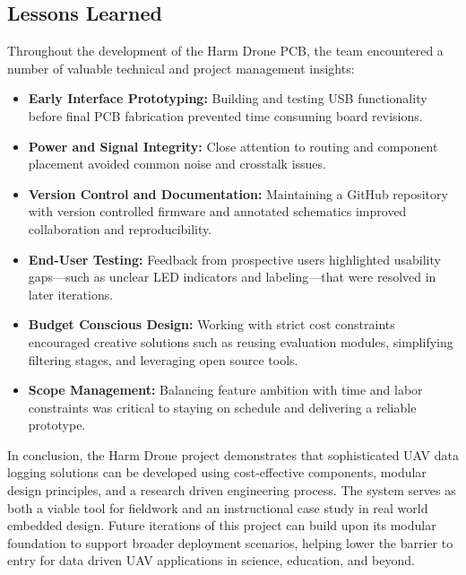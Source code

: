 \documentclass[12pt]{article}
\begin{document}
\subsection{Lessons Learned}

Throughout the development of the Harm Drone PCB, the team encountered a number of valuable technical and project management insights:

\begin{itemize}
\item \textbf{Early Interface Prototyping:} Building and testing USB functionality before final PCB fabrication prevented time consuming board revisions.
\item \textbf{Power and Signal Integrity:} Close attention to routing and component placement avoided common noise and crosstalk issues.
\item \textbf{Version Control and Documentation:} Maintaining a GitHub repository with version controlled firmware and annotated schematics improved collaboration and reproducibility.
\item \textbf{End-User Testing:} Feedback from prospective users highlighted usability gaps—such as unclear LED indicators and labeling—that were resolved in later iterations.
\item \textbf{Budget Conscious Design:} Working with strict cost constraints encouraged creative solutions such as reusing evaluation modules, simplifying filtering stages, and leveraging open source tools.
\item \textbf{Scope Management:} Balancing feature ambition with time and labor constraints was critical to staying on schedule and delivering a reliable prototype.
\end{itemize}

\par In conclusion, the Harm Drone project demonstrates that sophisticated UAV data logging solutions can be developed using cost-effective components, modular design principles, and a research driven engineering process. The system serves as both a viable tool for fieldwork and an instructional case study in real world embedded design. Future iterations of this project can build upon its modular foundation to support broader deployment scenarios, helping lower the barrier to entry for data driven UAV applications in science, education, and beyond.

\end{document}

